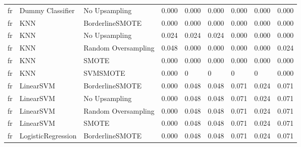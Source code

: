 \begin{tabular}{lllllllll}
      fr &             Dummy Classifier &       No Upsampling & 0.000 &                     0.000 &                 0.000 &                  0.000 &                                   0.000 &     0.000 \\
      fr &                          KNN &     BorderlineSMOTE & 0.000 &                     0.000 &                 0.000 &                  0.000 &                                   0.000 &     0.000 \\
      fr &                          KNN &       No Upsampling & 0.024 &                     0.024 &                 0.024 &                  0.000 &                                   0.000 &     0.000 \\
      fr &                          KNN & Random Oversampling & 0.048 &                     0.000 &                 0.000 &                  0.000 &                                   0.000 &     0.024 \\
      fr &                          KNN &               SMOTE & 0.000 &                     0.000 &                 0.000 &                  0.000 &                                   0.000 &     0.000 \\
      fr &                          KNN &            SVMSMOTE & 0.000 &                         0 &                     0 &                      0 &                                       0 &     0.000 \\
      fr &                    LinearSVM &     BorderlineSMOTE & 0.000 &                     0.048 &                 0.048 &                  0.071 &                                   0.024 &     0.071 \\
      fr &                    LinearSVM &       No Upsampling & 0.000 &                     0.048 &                 0.048 &                  0.071 &                                   0.024 &     0.071 \\
      fr &                    LinearSVM & Random Oversampling & 0.000 &                     0.048 &                 0.048 &                  0.071 &                                   0.024 &     0.071 \\
      fr &                    LinearSVM &               SMOTE & 0.000 &                     0.048 &                 0.048 &                  0.071 &                                   0.024 &     0.071 \\
      fr &           LogisticRegression &     BorderlineSMOTE & 0.000 &                     0.048 &                 0.048 &                  0.071 &                                   0.024 &     0.071 \\

\end{tabular}
